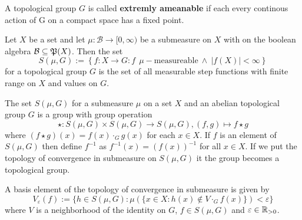 \begin{defin}
  A topological group $G$ is called \textbf{extremly ameanable} if each every continous action of G on a compact space has a fixed point.
\end{defin}

\begin{defin}\label{defin:sf}
  Let $X$ be a set and let $\mu\colon \mathcal{B} \to [0, \infty)$ be a submeasure on $X$ with on the boolean algebra $\mathcal{B} \subseteq \mathfrak{P}(X)$. Then the set
  \begin{equation*}
    S(\mu, G) := \left\{ f: X \to G\colon f \:\:\mu-\text{measureable} \: \land \: \left| f(X) \right| < \infty \right\}
  \end{equation*}
  for a topological group $G$ is the set of all measurable step functions with finite range on $X$ and values on $G$.
\end{defin}

\begin{thm}\label{thm:stop}
  The set $S(\mu, G)$ for a submeasure $\mu$ on a set $X$ and an abelian topological group $G$ is a group with group operation
  \begin{equation*}
    \star\colon S(\mu, G) \times S(\mu, G) \to S(\mu, G), (f, g) \mapsto f \star g
  \end{equation*}
  where $(f\star g)(x) = f(x) \cdot_G g(x)$ for each $x \in X$. If $f$ is an element of $S(\mu, G)$ then define $f^{-1}$ as $f^{-1}(x) = (f(x))^{-1}$ for all $x \in X$. If we put the topology of convergence in submeasure on $S(\mu, G)$ it the group
  becomes a topological group.

  A basis element of the topology of convergence in submeasure is given by
  \begin{equation*}
    V_\varepsilon(f) := \{ h \in S(\mu, G)\colon \mu(\{x \in X\colon h(x) \notin V\cdot_G f(x)\}) < \varepsilon \}
  \end{equation*}
  where $V$ is a neighborhood of the identity on $G$, $f \in S(\mu, G)$ and $\varepsilon \in \mathbb{R}_{>0}$.
\end{thm}

